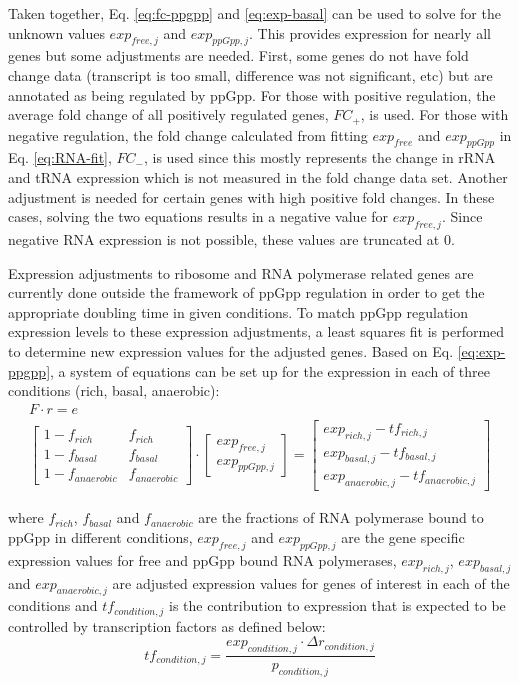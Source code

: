 \documentclass[12pt]{article}
\begin{document}
Taken together, Eq. \ref{eq:fc-ppgpp} and \ref{eq:exp-basal} can be used to solve for the unknown values $exp_{free, j}$ and $exp_{ppGpp, j}$.  This provides expression for nearly all genes but some adjustments are needed.  First, some genes do not have fold change data (transcript is too small, difference was not significant, etc) but are annotated as being regulated by ppGpp.  For those with positive regulation, the average fold change of all positively regulated genes, $FC_+$, is used.  For those with negative regulation, the fold change calculated from fitting $exp_{free}$ and $exp_{ppGpp}$ in Eq. \ref{eq:RNA-fit}, $FC_-$, is used since this mostly represents the change in rRNA and tRNA expression which is not measured in the fold change data set.  Another adjustment is needed for certain genes with high positive fold changes.  In these cases, solving the two equations results in a negative value for $exp_{free, j}$.  Since negative RNA expression is not possible, these values are truncated at 0.

Expression adjustments to ribosome and RNA polymerase related genes are currently done outside the framework of ppGpp regulation in order to get the appropriate doubling time in given conditions.  To match ppGpp regulation expression levels to these expression adjustments, a least squares fit is performed to determine new expression values for the adjusted genes.  Based on Eq. \ref{eq:exp-ppgpp}, a system of equations can be set up for the expression in each of three conditions (rich, basal, anaerobic):
\begin{gather}
F\cdot r = e \\
\begin{bmatrix}
1 - f_{rich} & f_{rich} \\
1 - f_{basal} & f_{basal} \\
1 - f_{anaerobic} & f_{anaerobic}
\end{bmatrix}
\cdot
\begin{bmatrix}
exp_{free, j} \\
exp_{ppGpp, j}
\end{bmatrix}
=
\begin{bmatrix}
exp_{rich, j} - tf_{rich, j} \\
exp_{basal, j} - tf_{basal, j}  \\
exp_{anaerobic, j} - tf_{anaerobic, j}
\end{bmatrix}
\end{gather}

\noindent where $f_{rich}$, $f_{basal}$ and $f_{anaerobic}$ are the fractions of RNA polymerase bound to ppGpp in different conditions, $exp_{free, j}$ and $exp_{ppGpp, j}$ are the gene specific expression values for free and ppGpp bound RNA polymerases, $exp_{rich, j}$, $exp_{basal, j}$ and $exp_{anaerobic, j}$ are adjusted expression values for genes of interest in each of the conditions and $tf_{condition, j}$ is the contribution to expression that is expected to be controlled by transcription factors as defined below:
\begin{equation}
tf_{condition, j} = \frac{exp_{condition, j} \cdot \Delta r_{condition, j}}{p_{condition, j}}
\end{equation}
\end{document}
